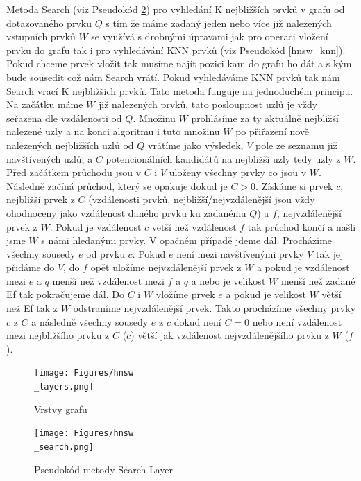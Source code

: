 \documentclass[czech,semestral,dept460,male,csharp,cpdeclaration]{diploma}
\begin{document}
		\label{MS}
		Metoda Search (viz Pseudokód \ref{hnsw_search}) pro vyhledání K nejbližších prvků v grafu od dotazovaného prvku $Q$ s tím že máme zadaný jeden nebo více již nalezených vstupních prvků $W$ se využívá s drobnými úpravami jak pro operaci vložení prvku do grafu tak i pro vyhledávání KNN prvků (viz Pseudokód \ref{hnsw_knn}). Pokud chceme prvek vložit tak musíme najít pozici kam do grafu ho dát a s kým bude sousedit což nám Search vrátí. Pokud vyhledáváme KNN prvků tak nám Search vrací K nejbližších prvků. Tato metoda funguje na jednoduchém principu. Na začátku máme $W$ již nalezených prvků, tato posloupnost uzlů je vždy seřazena dle vzdálenosti od $Q$. Množinu $W$ prohlásíme za ty aktuálně nejbližší nalezené uzly a na konci algoritmu i tuto množinu $W$ po přiřazení nově nalezených nejbližších uzlů od $Q$ vrátíme jako výsledek, $V$ pole ze seznamu již navštívených uzlů, a $C$ potencionálních kandidátů na nejbližší uzly tedy uzly z $W$. Před začátkem průchodu jsou v $C$ i $V$ uloženy všechny prvky co jsou v $W$. Následně začíná průchod, který se opakuje dokud je $C > 0$. Získáme si prvek $c$, nejbližší prvek z $C$ (vzdálenosti prvků, nejbližší/nejvzdálenější jsou vždy ohodnoceny jako vzdálenost daného prvku ku zadanému $Q$) a $f$, nejvzdálenější prvek z $W$. Pokud je vzdálenost $c$ vetší než vzdálenost $f$ tak průchod končí a našli jsme $W$ s námi hledanými prvky. V opačném případě jdeme dál. Procházíme všechny sousedy $e$ od prvku $c$. Pokud $e$ není mezi navštívenými prvky $V$ tak jej přidáme do $V$, do $f$ opět uložíme nejvzdálenější prvek z $W$ a pokud je vzdálenost mezi $e$ a $q$ menší než vzdálenost mezi $f$ a $q$ a nebo je velikost $W$ menší než zadané Ef tak pokračujeme dál. Do $C$ i $W$ vložíme prvek $e$ a pokud je velikost $W$ větší než Ef tak z $W$ odstraníme nejvzdálenější prvek. Takto procházíme všechny prvky $c$ z $C$ a následně všechny sousedy $e$ z $c$ dokud není $C = 0$ nebo není vzdálenost mezi nejbližšího prvku z $C$ ($c$) větší jak vzdálenost nejvzdálenějšího prvku z $W$ ($f$).
		
		\begin{figure}
			\centering
			\texttt{[image: Figures/hnsw\\\_layers.png]}
			\caption{Vrstvy grafu}
			\label{hnsw_layers}
		\end{figure}
		
		\begin{figure}
			\centering
			\texttt{[image: Figures/hnsw\\\_search.png]}
			\caption{Pseudokód metody Search Layer}
			\label{hnsw_search}
		\end{figure}
		
\end{document}
